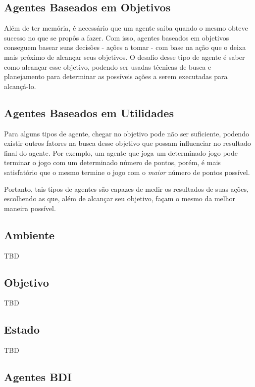 \subsection{Agentes Baseados em Objetivos}

Além de ter memória, é necessário que um agente saiba quando o mesmo obteve
sucesso no que se propôs a fazer. Com isso, agentes baseados em objetivos
conseguem basear suas decisões - ações a tomar - com base na ação que o deixa
mais próximo de alcançar seus objetivos. O desafio desse tipo de agente é saber
como alcançar esse objetivo, podendo ser usadas técnicas de busca e planejamento
para determinar as possíveis ações a serem executadas para alcançá-lo.

\subsection{Agentes Baseados em Utilidades}

Para alguns tipos de agente, chegar no objetivo pode não ser suficiente,
podendo existir outros fatores na busca desse objetivo que possam influenciar no
resultado final do agente. Por exemplo, um agente que joga um determinado jogo
pode terminar o jogo com um determinado número de pontos, porém, é mais
satisfatório que o mesmo termine o jogo com o \textit{maior} número de pontos
possível.

Portanto, tais tipos de agentes são capazes de medir os resultados de suas
ações, escolhendo as que, além de alcançar seu objetivo, façam o mesmo da melhor
maneira possível.

\subsection{Ambiente}

TBD

\subsection{Objetivo}

TBD

\subsection{Estado}

TBD

\subsection{Agentes BDI}


